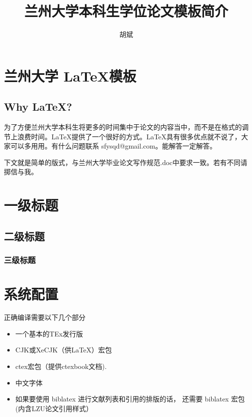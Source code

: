 \documentclass{LZUthesis}
\begin{document}
%
%

\title{兰州大学本科生学位论文模板简介}
\author{胡斌}



\maketitle

\makestatement



\frontmatter
\tableofcontents
\mainmatter
\chapter{兰州大学 \LaTeX 模板}

\section{Why \LaTeX ? }
为了方便兰州大学本科生将更多的时间集中于论文的内容当中，而不是在格式的调节上浪费时间。\LaTeX{}提供了一个很好的方式。\LaTeX{}具有很多优点就不说了，大家可以多用用。有什么问题联系 sfysqd@gmail.com。能解答一定解答。
\par 下文就是简单的版式，与兰州大学毕业论文写作规范.doc中要求一致。若有不同请掷信与我。
\chapter{一级标题}
\section{二级标题}
\subsection{三级标题}
\chapter{系统配置}
正确编译需要以下几个部分
\begin{itemize}

\item 一个基本的TEx发行版
\item CJK或XeCJK（供\LaTeX ）宏包
\item ctex宏包（提供ctexbook文档).
\item 中文字体
\item 如果要使用 biblatex 进行文献列表和引用的排版的话， 还需要 biblatex 宏包(内含LZU论文引用样式）
\end{itemize}
\end{document}

